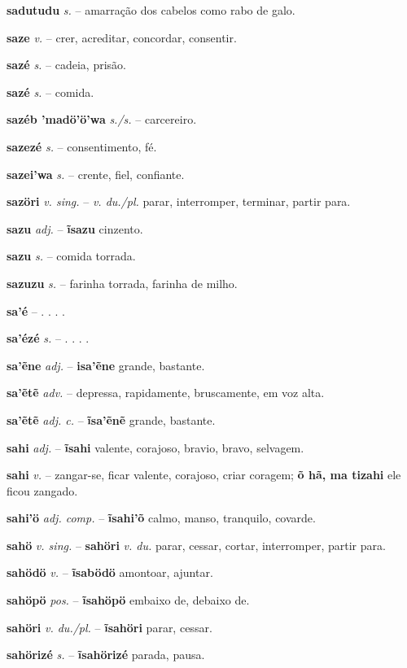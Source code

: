 \textbf{sadutudu} \textit{s.} -- amarração dos cabelos como rabo de galo.

\textbf{saze} \textit{v.} -- crer, acreditar, concordar, consentir.

\textbf{sazé} \textit{s.} -- cadeia, prisão.

\textbf{sazé} \textit{s.} -- comida.

\textbf{sazéb 'madö'ö'wa} \textit{s./s.} -- carcereiro.

\textbf{sazezé} \textit{s.} -- consentimento, fé.

\textbf{sazei'wa} \textit{s.} -- crente, fiel, confiante.

\textbf{sazöri} \textit{v. sing.} -- \textit{v. du./pl.} parar, interromper, terminar, partir para.

\textbf{sazu} \textit{adj.} -- \textbf{ĩsazu} cinzento.

\textbf{sazu} \textit{s.} -- comida torrada.

\textbf{sazuzu} \textit{s.} -- farinha torrada, farinha de milho.

\textbf{sa'é} \textit{} -- . . . .

\textbf{sa'ézé} \textit{s.} -- . . . .

\textbf{sa'ẽne} \textit{adj.} -- \textbf{isa'ẽne} grande, bastante.

\textbf{sa'ẽtẽ} \textit{adv.} -- depressa, rapidamente, bruscamente, em voz alta.

\textbf{sa'ẽtẽ} \textit{adj. c.} -- \textbf{ĩsa'ẽnẽ} grande, bastante.

\textbf{sahi} \textit{adj.} -- \textbf{ĩsahi} valente, corajoso, bravio, bravo, selvagem.

\textbf{sahi} \textit{v.} -- zangar-se, ficar valente, corajoso, criar coragem; \textbf{õ hã, ma tizahi} ele ficou zangado.

\textbf{sahi'ö} \textit{adj. comp.} -- \textbf{ĩsahi'õ} calmo, manso, tranquilo, covarde.

\textbf{sahö} \textit{v. sing.} -- \textbf{sahöri} \textit{v. du.} parar, cessar, cortar, interromper, partir para.

\textbf{sahödö} \textit{v.} -- \textbf{ĩsabödö} amontoar, ajuntar.

\textbf{sahöpö} \textit{pos.} -- \textbf{ĩsahöpö} embaixo de, debaixo de.

\textbf{sahöri} \textit{v. du./pl.} -- \textbf{ĩsahöri} parar, cessar.

\textbf{sahörizé} \textit{s.} -- \textbf{ĩsahörizé} parada, pausa.

